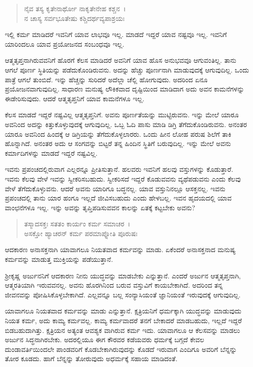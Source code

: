 \begin{verse}
ನೈವ ತಸ್ಯ ಕೃತೇನಾರ್ಥೋ ನಾಕೃತೇನೇಹ ಕಶ್ಚನ~।\\ನ ಚಾಸ್ಯ ಸರ್ವಭೂತೇಷು ಕಶ್ಚಿದರ್ಥವ್ಯಪಾಶ್ರಯಃ 
\end{verse}

{\small ಇಲ್ಲಿ ಕರ್ಮ ಮಾಡಿದರೆ ಇವನಿಗೆ ಯಾವ ಲಾಭವೂ ಇಲ್ಲ. ಮಾಡದೆ ಇದ್ದರೆ ಯಾವ ನಷ್ಟವೂ ಇಲ್ಲ. ಇವನಿಗೆ ಯಾರಿಂದಲೂ ಯಾವ ಪ್ರಯೋಜನದ ಸಂಬಂಧವೂ ಇಲ್ಲ.}

ಆತ್ಮತೃಪ್ತನಾಗಿರುವವನಿಗೆ ಹೊರಗೆ ಕೆಲಸ ಮಾಡಿದರೆ ಅವನಿಗೆ ಯಾವ ಹೊಸ ಅನುಭವವೂ ಆಗುವಂತಿಲ್ಲ. ತಾನು ಆಗಲೆ ಪೂರ್ಣ ಸ್ಥಿತಿಯನ್ನು ಪಡೆದುಕೊಂಡಿರುವನು. ಅದನ್ನು ಹೆಚ್ಚು ಪೂರ್ಣನಾಗಿ ಮಾಡುವುದಕ್ಕೆ ಆಗುವುದಿಲ್ಲ. ಒಂದು ಪಾತ್ರೆ ಆಗಲೆ ತುಂಬಿದೆ. ಇನ್ನು ಹೆಚ್ಚನ್ನು ಸುರಿದರೆ ಅದೆಲ್ಲಾ ಚೆಲ್ಲಿ ಹೋಗುವುದು. ಅದರಿಂದ ಏನೂ ಪ್ರಯೋಜನವಾಗುವುದಿಲ್ಲ. ಸಾಧಾರಣ ಮನುಷ್ಯ ಲೌಕಿಕವಾದ ದೃಷ್ಟಿಯಿಂದ ಮಾಡಿದಾಗ ಅದು ಅವನ ಕಾಮನೆಗಳನ್ನು ಈಡೇರಿಸುವುದು. ಆದರೆ ಆತ್ಮತೃಪ್ತನಿಗೆ ಯಾವ ಕಾಮನೆಗಳೂ ಇಲ್ಲ.

ಕೆಲಸ ಮಾಡದೆ ಇದ್ದರೆ ನಷ್ಟವಿಲ್ಲ ಆತ್ಮತೃಪ್ತನಿಗೆ. ಅವನು ಪೂರ್ಣತೆಯನ್ನು ಮುಟ್ಟಿರುವನು. ಇನ್ನು ಮೇಲೆ ಯಾರೂ ಅವನಿಂದ ಅದನ್ನು ಕಿತ್ತುಕೊಳ್ಳುವುದಕ್ಕೆ ಆಗುವುದಿಲ್ಲ. ಒಬ್ಬ ಓದಿ ಪಾಸು ಮಾಡಿ ಡಿಗ್ರಿ ತೆಗೆದುಕೊಂಡಿರುವನು. ಅನಂತರ ಯಾರೂ ಅವನಿಂದ ಹಿಂದಕ್ಕೆ ಆ ಡಿಗ್ರಿಯನ್ನು ತೆಗೆದುಕೊಳ್ಳಲಾರರು. ಒಂದು ಹೀನ ಲೋಹ ಪರುಷ ಶಿಲೆಗೆ ತಾಕಿ ಹೊನ್ನಾಗಿದೆ. ಅನಂತರ ಅದು ಆ ಸಂಗವನ್ನು ಬಿಟ್ಟರೆ ತನ್ನ ಹಿಂದಿನ ಸ್ಥಿತಿಗೆ ಬರುವುದಿಲ್ಲ. ಇನ್ನು ಮೇಲೆ ಅವನು ಕರ್ಮಾದಿಗಳನ್ನು ಮಾಡದೆ ಇದ್ದರೆ ನಷ್ಟವಿಲ್ಲ.

ಇವನು ಪ್ರಪಂಚದಲ್ಲಿರುವಾಗ ಎಲ್ಲರನ್ನೂ ಪ್ರೀತಿಸುತ್ತಾನೆ. ಹಲವರು ಇವನಿಗೆ ಹಲವು ವಸ್ತುಗಳನ್ನು ಕೊಡುತ್ತಾರೆ. ಇವನು ಕೆಲವು ವೇಳೆ ಇವನ್ನು ಸ್ವೀಕರಿಸಬಹುದು. ಸ್ವೀಕರಿಸದೆ ಇದ್ದರೆ ಕೊಡುವವನು ವ್ಯಥೆಪಡುವನು ಎಂದು ಕೆಲವು ವೇಳೆ ತೆಗೆದುಕೊಳ್ಳುವನು. ಆದರೆ ಅವನು ಯಾರಿಗೂ ಬದ್ಧನಲ್ಲ. ಯಾವ ವಸ್ತುನಿನಲ್ಲೂ ಆಸಕ್ತನಲ್ಲ. ಇವನು ಪ್ರಪಂಚದಲ್ಲಿ ತಾನು ಯಾರ ಹಂಗೂ ಇಲ್ಲದೆ ಜೀವಿಸಬಹುದು ಎಂದು ಹೇಳಬಲ್ಲ. ಇವನ ಹೃದಯದಲ್ಲಿ ಯಾವ ವಾಂಛನೆಗಳೂ ಇಲ್ಲ. ಇನ್ನು ಅವನ್ನು ತೃಪ್ತಿಪಡಿಸುವವನ ಕಾಲನ್ನು ಏತಕ್ಕೆ ಕಟ್ಟಬೇಕು ಅವನು?

\begin{verse}
ತಸ್ಮಾದಸಕ್ತಃ ಸತತಂ ಕಾರ್ಯಂ ಕರ್ಮ ಸಮಾಚರ~।\\ಅಸಕ್ತೋ ಹ್ಯಾಚರನ್ ಕರ್ಮ ಪರಮಾಪ್ನೋತಿ ಪೂರುಷಃ 
\end{verse}

{\small ಆದಕಾರಣ ಅನಾಸಕ್ತನಾಗಿ ಯಾವಾಗಲೂ ನಿಯತವಾದ ಕರ್ಮವನ್ನು ಮಾಡು. ಏಕೆಂದರೆ ಅನಾಸಕ್ತನಾದ ಮನುಷ್ಯ ಕರ್ಮವನ್ನು ಮಾಡುತ್ತ ಮುಕ್ತಿಯನ್ನು ಪಡೆಯುತ್ತಾನೆ.}

ಶ‍್ರೀಕೃಷ್ಣ ಅರ್ಜುನನಿಗೆ ಆದಕಾರಣ ನೀನು ಯುದ್ಧವನ್ನು ಮಾಡಬೇಕು ಎನ್ನುತ್ತಾನೆ. ಎಂದರೆ ಅರ್ಜುನ ಆತ್ಮತೃಪ್ತನಾಗಿ, ಆತ್ಮರತಿಯಾಗಿ ಇರುವವನಲ್ಲ. ಅವನು ಹೊರಗಿನಿಂದ ಬರುವ ವಸ್ತುವಿಗೆ ಕಾಯಬೇಕಾಗಿದೆ. ಅದರಿಂದ ತನ್ನ ಜೀವನವನ್ನು ಪೋಷಿಸಿಕೊಳ್ಳಬೇಕಾಗಿದೆ. ಎಲ್ಲವನ್ನೂ ಬಲ್ಲ ಸಂನ್ಯಾಸಿಯಂತೆ ಜ್ಞಾನಿಯಂತೆ ಇರುವುದಕ್ಕೆ ಆಗುವುದಿಲ್ಲ.

ಯಾವಾಗಲೂ ನಿಯತವಾದ ಕರ್ಮವನ್ನು ಮಾಡು ಎನ್ನುತ್ತಾನೆ. ಕ್ಷತ್ರಿಯನಿಗೆ ಧರ್ಮಕ್ಕಾಗಿ ಯುದ್ಧವನ್ನು ಮಾಡುವುದು ನಿಯತ ಕರ್ಮ, ಅದು ಕಾಮ್ಯ ಕರ್ಮವಲ್ಲ. ಕಾಮ್ಯ ಕರ್ಮವಾದರೆ ತನಗೆ ಬೇಕಾದರೆ ಮಾಡಬಹುದು, ಇಲ್ಲದೆ ಇದ್ದರೆ ಬಿಡಬಹುದಾಗಿತ್ತು. ಕ್ಷತ್ರಿಯನ ಅತ್ಯಂತ ಆವಶ್ಯಕ ವಾಗಿರುವ ಕರ್ಮ ಇದು. ಯಾವಾಗಲೂ ಆ ಕೆಲಸವನ್ನು ಮಾಡಲು ಅರ್ಜುನ ಸಿದ್ಧನಾಗಿರಬೇಕು. ಅದರಲ್ಲಿಯೂ ಈಗ ಕೌರವರ ಕಡೆಯವರು ಧರ್ಮಕ್ಕೆ ಬಗ್ಗದೆ ಕೇವಲ ದುಂಡಾವರ್ತಿಯಿಂದಲೇ ಪಾಂಡವರಿಗೆ ಕೊಡಬೇಕಾಗಿರುವುದನ್ನು ಕೊಡದೆ ಇರುವಾಗ ಎಂದಿಗೂ ಅವರಿಗೆ ಬೆನ್ನನ್ನು ತೋರ ಕೂಡದು. ಹಾಗೆ ಬೆನ್ನನ್ನು ತೋರುವುದು ಅಧರ್ಮಕ್ಕೆ ಸಹಾಯ ಮಾಡಿದಂತೆ.

